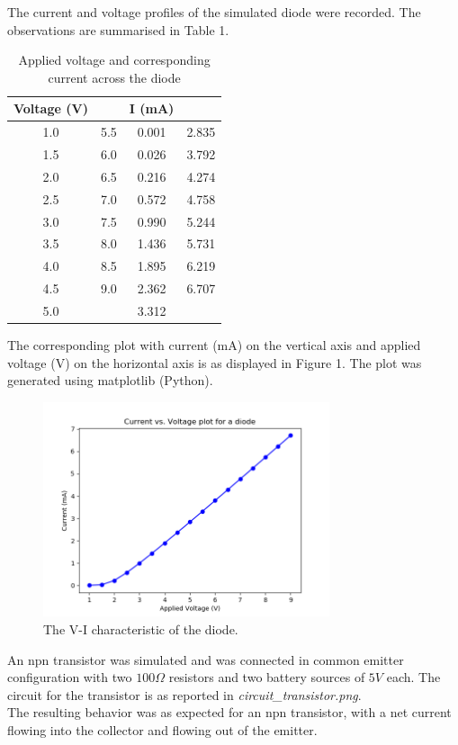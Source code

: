 \documentclass{article}
\begin{document}
	The current and voltage profiles of the simulated diode were recorded. The observations are summarised in Table 1.
	\begin{table}[!h]
		\begin{center}
			\begin{tabular}{|c|c|c|c|}
				\hline
				Voltage (V) & 	& I (mA) & \\
				\hline
				1.0 & 5.5 & 0.001 & 2.835 \\
				1.5 & 6.0 & 0.026 & 3.792 \\
				2.0 & 6.5 & 0.216 & 4.274 \\
				2.5 & 7.0 & 0.572 & 4.758 \\
				3.0 & 7.5 & 0.990 & 5.244 \\
				3.5 & 8.0 & 1.436 & 5.731 \\
				4.0 & 8.5 & 1.895 & 6.219 \\
				4.5 & 9.0 & 2.362 & 6.707\\
				5.0 &	& 3.312 & \\
				\hline
			\end{tabular}
			\caption{Applied voltage and corresponding current across the diode}
		\end{center}
	\end{table}


	The corresponding plot with current (mA) on the vertical axis and applied voltage (V) on the horizontal axis is as displayed in Figure 1. The plot was generated using matplotlib (Python).\\
	\begin{figure}[!h]
		\begin{center}
			\includegraphics[width=0.75\textwidth]{plot_diode.png}
		\end{center}
		\caption{The V-I characteristic of the diode.}
	\end{figure}
	
	
	An npn transistor was simulated and was connected in common emitter configuration with two $100\Omega$ resistors and two battery sources of $5V$ each. The circuit for the transistor is as reported in \textit{circuit\_transistor.png}.\\
	The resulting behavior was as expected for an npn transistor, with a net current flowing into the collector and flowing out of the emitter.
\end{document}
